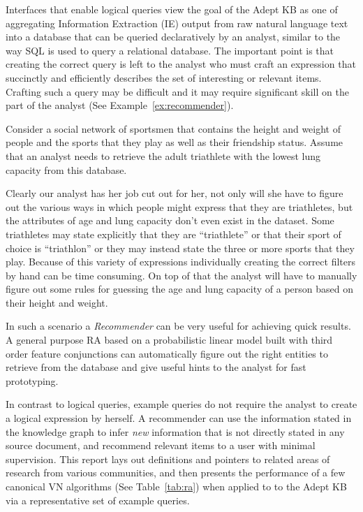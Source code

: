\documentclass[paper=a4,fontsize=11pt]{scrartcl}
\newcommand{\Tabref}[1]{Table~\ref{#1}}
\newcommand{\Exref}[1]{Example~\ref{#1}}
\numberwithin{equation}{section}    %
\numberwithin{figure}{section}      %
\numberwithin{table}{section}       %
\begin{document}
Interfaces that enable logical queries view the goal of the
Adept KB as one of aggregating Information Extraction (IE) output from raw
natural language text into a database that can be queried declaratively by an
analyst, similar to the way SQL is used to query a relational database.
The important point is that creating the correct query is left to the analyst
who must craft an expression that succinctly and
efficiently describes the set of interesting or relevant items. Crafting
such a query may be difficult and it may require significant skill on the part of the
analyst (See \Exref{ex:recommender}).
\begin{example}\label{ex:recommender}
  Consider a social network of sportsmen that contains the height
  and weight of people and the sports that they play as well as their friendship
  status. Assume that an analyst needs to retrieve the adult triathlete
  with the lowest lung capacity from this database.

  Clearly our analyst has her job cut out for her, not only will she have to
  figure out the various ways in which people might express that they are
  triathletes, but the attributes of age and lung capacity don't even exist in
  the dataset. Some triathletes may state explicitly that they are
  ``triathlete'' or that their sport of choice is ``triathlon'' or they may
  instead state the three or more sports that they play. Because of this variety
  of expressions individually creating
  the correct filters by hand can be time consuming. On top of that the analyst
  will have to manually figure out some rules for guessing the age and lung capacity of
  a person  based on their height and weight.

  In such a scenario a \textit{Recommender} can be very useful for achieving quick
  results. A general purpose RA based on a probabilistic linear model built with
  third order feature conjunctions can automatically figure out the right
  entities to retrieve from the database and give useful hints to the analyst
  for fast prototyping.
\end{example}
In contrast to logical queries,
example queries do not require the analyst to create a
logical expression by herself. A recommender can use the information stated
in the knowledge graph to infer \textit{new} information that is not
directly stated in
any source document, and recommend relevant items to a user with
minimal supervision. This report lays out definitions and pointers to related areas of
research from various communities, and then presents the performance of
a few canonical VN algorithms (See \Tabref{tab:ra}) when applied to to the Adept
KB via a representative set of example queries.
\end{document}
